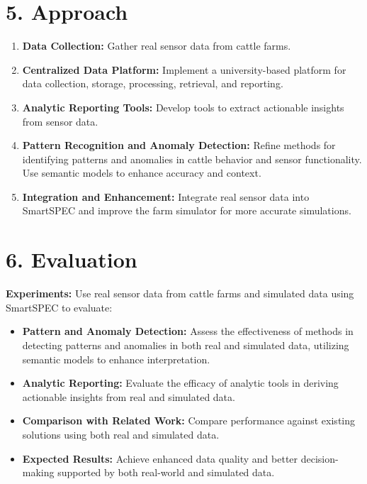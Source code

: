 \documentclass[11pt]{article}
\begin{document}
\section*{5. Approach}
\begin{enumerate}[label=\arabic*., wide=0pt, left=0pt]
    \item \textbf{Data Collection:} Gather real sensor data from cattle farms.
    \item \textbf{Centralized Data Platform:} Implement a university-based platform for data collection, storage, processing, retrieval, and reporting.
    \item \textbf{Analytic Reporting Tools:} Develop tools to extract actionable insights from sensor data.
    \item \textbf{Pattern Recognition and Anomaly Detection:} Refine methods for identifying patterns and anomalies in cattle behavior and sensor functionality. Use semantic models to enhance accuracy and context.
    \item \textbf{Integration and Enhancement:} Integrate real sensor data into SmartSPEC and improve the farm simulator for more accurate simulations.
\end{enumerate}

\section*{6. Evaluation}
\textbf{Experiments:} Use real sensor data from cattle farms and simulated data using SmartSPEC to evaluate:
\begin{itemize}
    \item \textbf{Pattern and Anomaly Detection:} Assess the effectiveness of methods in detecting patterns and anomalies in both real and simulated data, utilizing semantic models to enhance interpretation.
    \item \textbf{Analytic Reporting:} Evaluate the efficacy of analytic tools in deriving actionable insights from real and simulated data.
    \item \textbf{Comparison with Related Work:} Compare performance against existing solutions using both real and simulated data.
    \item \textbf{Expected Results:} Achieve enhanced data quality and better decision-making supported by both real-world and simulated data.
\end{itemize}
\end{document}
